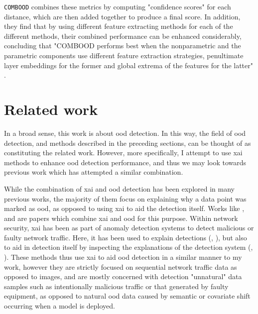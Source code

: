 \documentclass[UKenglish]{uiomasterthesis} %
\theoremstyle{definition}
\begin{document}
\texttt{COMBOOD} combines these metrics by computing "confidence scores" for each distance, which are then added together to produce a final score. In addition, they find that by using different feature extracting methods for each of the different methods, their combined performance can be enhanced considerably, concluding that "COMBOOD performs best when the nonparametric and the parametric components use different feature extraction strategies, penultimate layer embeddings for the former and global extrema of the features for the latter" \cite{combood}.

\section{Related work} \label{section:relatedwork}

In a broad sense, this work is about \ac{ood} detection. In this way, the field of \ac{ood} detection, and methods described in the preceding sections, can be thought of as constituting the related work. However, more specifically, I attempt to use \ac{xai} methods to enhance \ac{ood} detection performance, and thus we may look towards previous work which has attempted a similar combination.

While the combination of \ac{xai} and \ac{ood} detection has been explored in many previous works, the majority of them focus on explaining why a data point was marked as \ac{ood}, as opposed to using \ac{xai} to aid the detection itself. Works like \cite{uncertainty}, \cite{generalxaiforood} and \cite{tallon2020explainable} are papers which combine \ac{xai} and \ac{ood} for this purpose. Within network security, \ac{xai} has been as part of anomaly detection systems to detect malicious or faulty network traffic. Here, it has been used to explain detections (\cite{idsxai}, \cite{mahbooba}), but also to aid in detection itself by inspecting the explanations of the detection system (\cite{tcydenova2021detection}, \cite{dnsxai}). These methods thus use \ac{xai} to aid \ac{ood} detection in a similar manner to my work, however they are strictly focused on sequential network traffic data as opposed to images, and are mostly concerned with detection "unnatural" data samples such as intentionally malicious traffic or that generated by faulty equipment, as opposed to natural \ac{ood} data caused by semantic or covariate shift occurring when a model is deployed.
\end{document}
